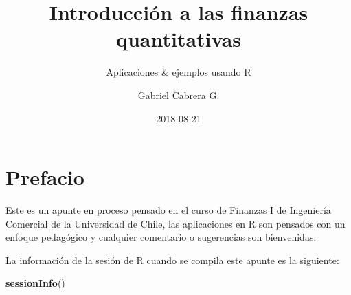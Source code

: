 \documentclass[12pt,]{book}
\title{Introducción a las finanzas quantitativas}
\subtitle{Aplicaciones \& ejemplos usando R}
\author{Gabriel Cabrera G.}
\date{2018-08-21}
\newenvironment{Shaded}{\begin{snugshade}}{\end{snugshade}}
\newcommand{\KeywordTok}[1]{\textcolor[rgb]{0.13,0.29,0.53}{\textbf{#1}}}
\newcommand{\NormalTok}[1]{#1}
\begin{document}
\maketitle

{
\hypersetup{linkcolor=black}
\setcounter{tocdepth}{2}
\tableofcontents
}
\listoftables
\listoffigures
\chapter*{Prefacio}\label{prefacio}


Este es un apunte en proceso pensado en el curso de Finanzas I de
Ingeniería Comercial de la Universidad de Chile, las aplicaciones en R
son pensados con un enfoque pedagógico y cualquier comentario o
sugerencias son bienvenidas.

La información de la sesión de R cuando se compila este apunte es la
siguiente:

\begin{Shaded}
\begin{Highlighting}[]
\KeywordTok{sessionInfo}\NormalTok{()}
\end{Highlighting}
\end{Shaded}
\end{document}
